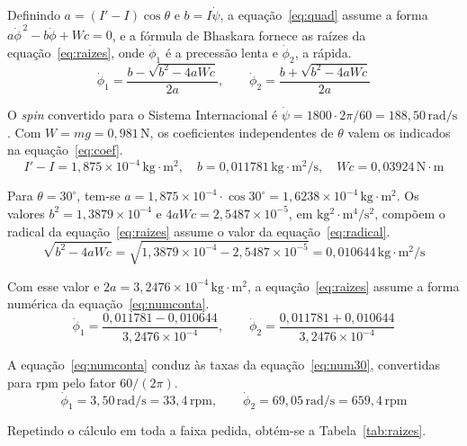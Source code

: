 \documentclass[12pt,a4paper]{article}
\newcommand{\un}[1]{\,\mathrm{#1}}
\newcommand{\phid}{\dot{\phi}}
\newcommand{\psid}{\dot{\psi}}
\begin{document}
Definindo $a=(I'-I)\cos\theta$ e $b=I\psid$, a equação~\ref{eq:quad} assume a forma $a\phid^{\,2}-b\phid+Wc=0$, e a fórmula de Bhaskara fornece as raízes da equação~\ref{eq:raizes}, onde $\phid_1$ é a precessão lenta e $\phid_2$, a rápida.
\begin{equation}
\phid_{1} = \frac{b-\sqrt{b^2-4aWc}}{2a},
\qquad
\phid_{2} = \frac{b+\sqrt{b^2-4aWc}}{2a}
\label{eq:raizes}
\end{equation}

O \textit{spin} convertido para o Sistema Internacional é $\psid=1800\cdot2\pi/60=188,50\un{rad/s}$. Com $W=mg=0,981\un{N}$, os coeficientes independentes de $\theta$ valem os indicados na equação~\ref{eq:coef}.
\begin{equation}
I'-I = 1,875\times10^{-4}\un{kg\cdot m^2},
\quad
b = 0,011781\un{kg\cdot m^2/s},
\quad
Wc = 0,03924\un{N\cdot m}
\label{eq:coef}
\end{equation}

Para $\theta=30^\circ$, tem-se $a=1,875\times10^{-4}\cdot\cos30^\circ=1,6238\times10^{-4}\un{kg\cdot m^2}$. Os valores $b^2=1,3879\times10^{-4}$ e $4aWc=2,5487\times10^{-5}$, em $\mathrm{kg^2\cdot m^4/s^2}$, compõem o radical da equação~\ref{eq:raizes} assume o valor da equação~\ref{eq:radical}.
\begin{equation}
\sqrt{b^2-4aWc}=\sqrt{1,3879\times10^{-4}-2,5487\times10^{-5}}=0,010644\un{kg\cdot m^2/s}
\label{eq:radical}
\end{equation}

Com esse valor e $2a=3,2476\times10^{-4}\un{kg\cdot m^2}$, a equação~\ref{eq:raizes} assume a forma numérica da equação~\ref{eq:numconta}.
\begin{equation}
\phid_1=\frac{0,011781-0,010644}{3,2476\times10^{-4}},
\qquad
\phid_2=\frac{0,011781+0,010644}{3,2476\times10^{-4}}
\label{eq:numconta}
\end{equation}

A equação~\ref{eq:numconta} conduz às taxas da equação~\ref{eq:num30}, convertidas para rpm pelo fator $60/(2\pi)$.
\begin{equation}
\phid_1 = 3,50\un{rad/s} = 33,4\un{rpm},
\qquad
\phid_2 = 69,05\un{rad/s} = 659,4\un{rpm}
\label{eq:num30}
\end{equation}

Repetindo o cálculo em toda a faixa pedida, obtém-se a Tabela~\ref{tab:raizes}.
\end{document}
